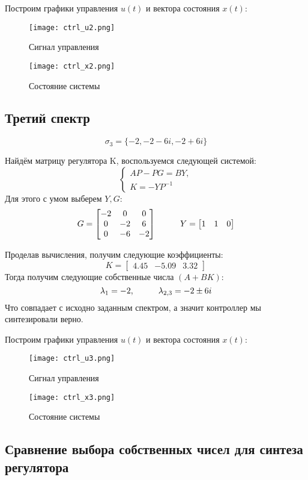 Построим графики управления $u(t)$  и вектора состояния $x(t)$:
\begin{figure}[ht]
  \centering
  \texttt{[image: ctrl\_u2.png]}
  \caption{Сигнал управления}
\end{figure}
\begin{figure}[ht]
  \centering
  \texttt{[image: ctrl\_x2.png]}
  \caption{Состояние системы}
\end{figure}

\newpage
\subsection{Третий спектр}
$$
  \sigma_3 = \{-2, -2-6i, -2+6i\} 
$$

Найдём матрицу регулятора K, воспользуемся следующей системой:
$$
\begin{cases}
  AP - PG = BY, \\
  K = -YP^{-1}
\end{cases}
$$ Для этого с умом выберем $Y,G$:
$$
G = \begin{bmatrix}
    -2  &  0  & 0 \\
     0  & -2  & 6 \\
     0  &  -6  & -2 
\end{bmatrix} \hspace*{1cm} Y = \begin{bmatrix}
  1 & 1 & 0
\end{bmatrix}
$$

Проделав вычисления, получим следующие коэффициенты:
$$
  K = \begin{bmatrix}
    4.45 & -5.09 & 3.32
  \end{bmatrix}
$$
Тогда получим следующие собственные числа $(A+BK)$:
$$
    \lambda_1 = -2, \hspace*{1cm} \lambda_{2,3} = -2 \pm 6i
$$
Что совпадает с исходно заданным спектром, а значит контроллер мы синтезировали верно.

Построим графики управления $u(t)$  и вектора состояния $x(t)$:
\newpage
\begin{figure}[ht]
  \centering
  \texttt{[image: ctrl\_u3.png]}
  \caption{Сигнал управления}
\end{figure}
\begin{figure}[ht]
  \centering
  \texttt{[image: ctrl\_x3.png]}
  \caption{Состояние системы}
\end{figure}

\subsection{Сравнение выбора собственных чисел для синтеза регулятора}

